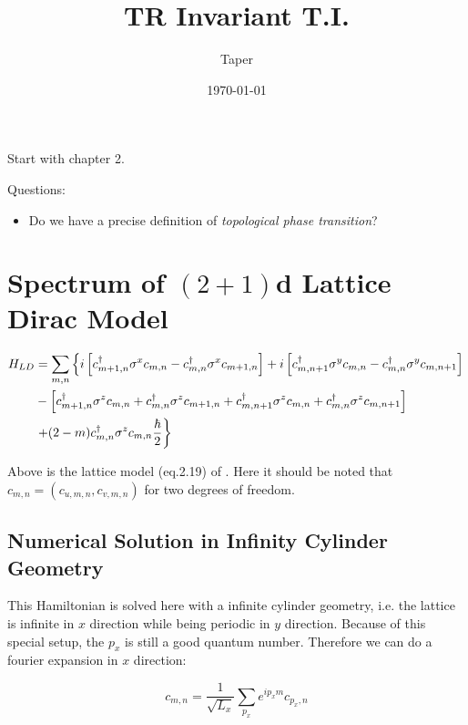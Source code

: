 \documentclass{article}
\title{TR Invariant T.I.}
\date{\today}
\author{Taper}
\begin{document}
\maketitle
{}
\tableofcontents
Start with chapter 2.

Questions:
\begin{itemize}
    \item Do we have a precise definition of \textit{topological phase
        transition}?
\end{itemize}

\section{Spectrum of \texorpdfstring{$(2+1)$}-d Lattice Dirac Model}
\label{sec:2+1d-LDirac Model}
\begin{align}
    H_{LD} &= \sum_{m,n}\left\{
        i \left[ c^\dagger_{m+1,n}\sigma^x c_{m,n}
            - c^\dagger_{m,n}\sigma^x c_{m+1,n}\right]
        + i \left[ c^\dagger_{m,n+1}\sigma^y c_{m,n}
            - c^\dagger_{m,n}\sigma^y c_{m,n+1} \right]
        \right.
        \nonumber\\
        &- \left[
            c^\dagger_{m+1,n}\sigma^z c_{m,n}
            + c^\dagger_{m,n}\sigma^z c_{m+1,n}
            + c^\dagger_{m,n+1}\sigma^z c_{m,n}
            + c^\dagger_{m,n}\sigma^z c_{m,n+1}
        \right]
        \nonumber\\
        & \left. + (2-m) c^\dagger_{m,n}\sigma^z c_{m,n}
        \vphantom{xx}\frac\hbar2
    \right\}
\end{align}

Above is the lattice model (eq.2.19) of \cite{Hughes2009}. Here it
should be noted that $c_{m,n}=(c_{u,m,n}, c_{v,m,n})$ for two degrees
of freedom. 

\subsection{Numerical Solution in Infinity Cylinder Geometry}
\label{sec:Numerical Solution in Infinity Cylinder Geometry}

This Hamiltonian is solved here with a infinite cylinder geometry, i.e.
the lattice is infinite in $x$ direction while being periodic in $y$
direction. Because of this special setup, the $p_x$ is still a good
quantum number. Therefore we can do a fourier expansion in $x$
direction:

\begin{equation}
    c_{m,n} = \frac{1}{\sqrt{L_x}} \sum_{p_x} e^{ip_x m} c_{p_x,n}
\end{equation}
\end{document}
